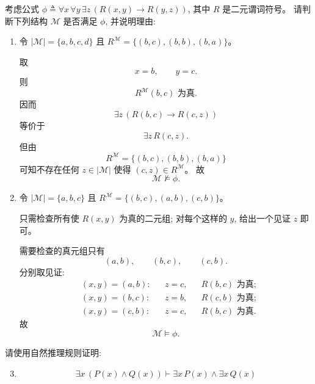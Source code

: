 \begin{problem}[一阶谓词逻辑公式的语义]
  考虑公式 $\phi \triangleq \forall x\, \forall y\, \exists z\, (R(x, y) \to R(y, z))$,
  其中 $R$ 是二元谓词符号。
  请判断下列结构 $\mathcal{M}$ 是否满足 $\phi$,
  并说明理由:
  \begin{enumerate}[(1)]
    \item 令 $|\mathcal{M}| = \{a, b, c, d\}$ 且
      $R^{\mathcal{M}} = \{(b, c), (b, b), (b, a)\}$。
      \begin{solution}
        取
        \[
          x = b, \qquad y = c.
        \]
        则
        \[
          R^{\mathcal{M}}(b, c) \text{ 为真}.
        \]
        因而
        \[
          \exists z\, (R(b, c) \to R(c, z))
        \]
        等价于
        \[
          \exists z\, R(c, z).
        \]
        但由
        \[
          R^{\mathcal{M}} = \{(b, c), (b, b), (b, a)\}
        \]
        可知不存在任何 $z \in |\mathcal{M}|$ 使得 $(c, z) \in R^{\mathcal{M}}$。
        故
        \[
          \mathcal{M} \not\models \phi.
        \]
      \end{solution}
    \item 令 $|\mathcal{M}| = \{a, b, c\}$ 且
      $R^{\mathcal{M}} = \{(b, c), (a, b), (c, b)\}$。
      \begin{solution}
				只需检查所有使 $R(x, y)$ 为真的二元组;
				对每个这样的 $y$, 给出一个见证 $z$ 即可。

        需要检查的真元组只有
        \[
          (a, b), \qquad (b, c), \qquad (c, b).
        \]
        分别取见证:
        \begin{align*}
          &(x, y) = (a, b): && z = c, && R(b, c) \text{ 为真}; \\
          &(x, y) = (b, c): && z = b, && R(c, b) \text{ 为真}; \\
          &(x, y) = (c, b): && z = c, && R(b, c) \text{ 为真}.
        \end{align*}
        故
        \[
          \mathcal{M} \models \phi.
        \]
      \end{solution}
  \end{enumerate}
\end{problem}

\begin{problem}[一阶谓词逻辑的自然推理系统]
  请使用自然推理规则证明:

  \begin{enumerate}[(1)]
    \setcounter{enumi}{2}
    \item
      \[
        \exists x\, (P(x) \land Q(x)) \vdash \exists x\, P(x) \land \exists x\, Q(x)
      \]
  \end{enumerate}
\end{problem}

